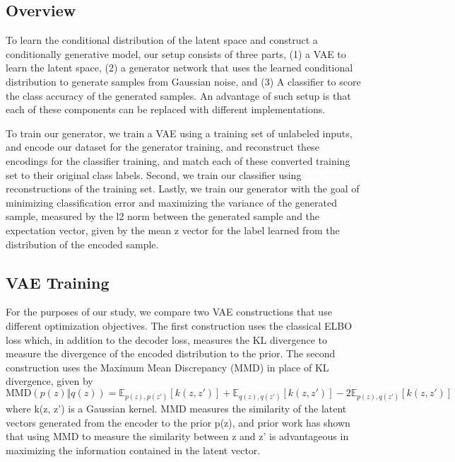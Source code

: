 \documentclass{article}
\begin{document}
\subsection{Overview}

To learn the conditional distribution of the latent space and construct a conditionally generative model, our setup consists of three parts, (1) a VAE to learn the latent space, (2) a generator network that uses the learned conditional distribution to generate samples from Gaussian noise, and (3) A classifier to score the class accuracy of the generated samples. An advantage of such setup is that each of these components can be replaced with different implementations.\par
To train our generator, we train a VAE using a training set of unlabeled inputs, and encode our dataset for the generator training, and reconstruct these encodings for the classifier training, and match each of these converted training set to their original class labels. Second, we train our classifier using reconstructions of the training set. Lastly, we train our generator with the goal of minimizing classification error and maximizing the variance of the generated sample, measured by the l2 norm between the generated sample and the expectation vector, given by the mean z vector for the label learned from the distribution of the encoded sample.

\subsection{VAE Training}

For the purposes of our study, we compare two VAE constructions that use different optimization objectives. The first construction uses the classical ELBO loss which, in addition to the decoder loss, measures the KL divergence to measure the divergence of the encoded distribution to the prior. The second construction uses the Maximum Mean Discrepancy (MMD) in place of KL divergence, given by
\begin{equation} 
\mathrm{MMD}(p(z) \Vert q(z)) = \mathbb{E}_{p(z), p(z')}[k(z, z')] + \mathbb{E}_{q(z), q(z')}[k(z, z')]  - 2 \mathbb{E}_{p(z), q(z')}[k(z, z')]
\end{equation}
where k(z, z') is a Gaussian kernel. MMD measures the similarity of the latent vectors generated from the encoder to the prior p(z), and prior work has shown that using MMD  to measure the similarity between z and z' is advantageous in maximizing the information contained in the latent vector\cite{zhao2017infovae}.
\end{document}
